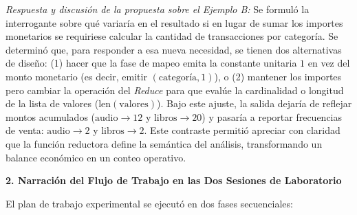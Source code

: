 \documentclass[12pt,a4paper]{article}
\begin{document}
\vspace{0.1cm}
\noindent\textit{Respuesta y discusión de la propuesta sobre el Ejemplo B:} Se formuló la interrogante sobre qué variaría en el resultado si en lugar de sumar los importes monetarios se requiriese calcular la cantidad de transacciones por categoría. Se determinó que, para responder a esa nueva necesidad, se tienen dos alternativas de diseño: (1) hacer que la fase de mapeo emita la constante unitaria $1$ en vez del monto monetario (es decir, emitir $(\text{categoría}, 1)$), o (2) mantener los importes pero cambiar la operación del \textit{Reduce} para que evalúe la cardinalidad o longitud de la lista de valores ($\text{len}(\text{valores})$). Bajo este ajuste, la salida dejaría de reflejar montos acumulados ($\text{audio} \rightarrow 12$ y $\text{libros} \rightarrow 20$) y pasaría a reportar frecuencias de venta: $\text{audio} \rightarrow 2$ y $\text{libros} \rightarrow 2$. Este contraste permitió apreciar con claridad que la función reductora define la semántica del análisis, transformando un balance económico en un conteo operativo.

\vspace{0.3cm}
\noindent\textbf{2. Narración del Flujo de Trabajo en las Dos Sesiones de Laboratorio}

El plan de trabajo experimental se ejecutó en dos fases secuenciales:
\end{document}
